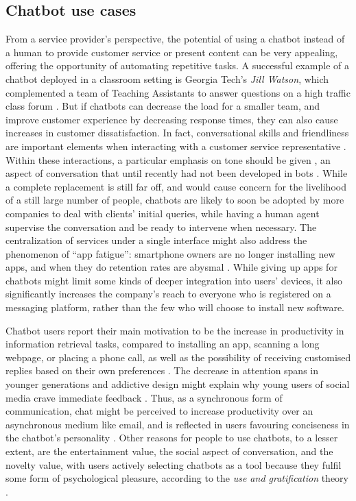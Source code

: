 \subsection{Chatbot use cases}
From a service provider's perspective, the potential of using a chatbot instead of a human to provide customer service or present content can be very appealing, offering the opportunity of automating repetitive tasks. A successful example of a chatbot deployed in a classroom setting is Georgia Tech's \textit{Jill Watson}, which complemented a team of Teaching Assistants to answer questions on a high traffic class forum \cite{Eicher2016}. But if chatbots can decrease the load for a smaller team, and improve customer experience by decreasing response times, they can also cause increases in customer dissatisfaction. In fact, conversational skills and friendliness are important elements when interacting with a customer service representative \cite{Kang2013}. Within these interactions, a particular emphasis on tone should be given \cite{morris1988many}, an aspect of conversation that until recently had not been developed in bots \cite{Hu2018}. While a complete replacement is still far off, and would cause concern for the livelihood of a still large number of people, chatbots are likely to soon be adopted by more companies to deal with clients' initial queries, while having a human agent supervise the conversation and be ready to intervene when necessary. The centralization of services under a single interface might also address the phenomenon of ``app fatigue'': smartphone owners are no longer installing new apps, and when they do retention rates are abysmal \cite{appfatigue}. While giving up apps for chatbots might limit some kinds of deeper integration into users' devices, it also significantly increases the company's reach to everyone who is registered on a messaging platform, rather than the few who will choose to install new software. 

Chatbot users report their main motivation to be the increase in productivity in information retrieval tasks, compared to installing an app, scanning a long webpage, or placing a phone call, as well as the possibility of receiving customised replies based on their own preferences \cite{10.1007/978-3-319-70284-1_30}. The decrease in attention spans in younger generations \cite{Wilmer2017} and addictive design might explain why young users of social media crave immediate feedback \cite{brandtzaeg2016should}. Thus, as a synchronous form of communication, chat might be perceived to increase productivity over an asynchronous medium like email, and is reflected in users favouring conciseness in the chatbot's personality \cite{10.1007/978-3-319-67744-6_28}. Other reasons for people to use chatbots, to a lesser extent, are the entertainment value, the social aspect of conversation, and the novelty value, with users actively selecting chatbots as a tool because they fulfil some form of psychological pleasure, according to the \textit{use and gratification} theory \cite{10.1007/978-3-319-70284-1_30}.
